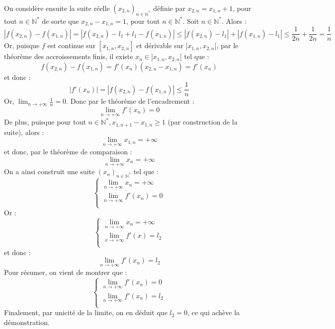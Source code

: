 \documentclass[9pt,a4paper]{article}
\begin{document}
On considère ensuite la suite réelle $(x_{2, n})_{n \in \mathbb{N}^*}$ définie par $x_{2, n} = x_{1, n} + 1$, pour tout $n \in \mathbb{N}^*$ de sorte que $x_{2, n} - x_{1, n} = 1$, pour tout $n \in \mathbb{N}^*$. Soit $n \in \mathbb{N}^*$. Alors :
$$
|f(x_{2, n}) - f(x_{1, n})| = |f(x_{2, n}) - l_1 + l_1 - f(x_{1, n})| \leq |f(x_{2, n}) - l_1| + |f(x_{1, n}) - l_1| \leq \frac{1}{2n} + \frac{1}{2n} = \frac{1}{n}
$$
Or, puisque $f$ est continue sur $[x_{1, n}, x_{2, n}]$ et dérivable sur $]x_{1, n}, x_{2, n}[$, par le théorème des accroissements finis, il existe $x_n \in ]x_{1, n}, x_{2, n}[$ tel que :
$$
f(x_{2, n}) - f(x_{1, n}) = f'(x_n)(x_{2, n} - x_{1, n}) = f'(x_n)
$$
et donc :
$$
|f'(x_n)| = |f(x_{2, n}) - f(x_{1, n})| \leq \frac{1}{n}
$$
Or, $\lim_{n\to+\infty} \frac{1}{n} = 0$. Donc par le théorème de l'encadrement :
$$
\lim_{n\to+\infty} f'(x_n) = 0
$$
De plus, puisque pour tout $n \in \mathbb{N}^*, x_{1, n + 1} - x_{1, n} \geq 1$ (par construction de la suite), alors :
$$
\lim_{n\to+\infty} x_{1, n} = +\infty
$$
et donc, par le théorème de comparaison :
$$
\lim_{n\to+\infty} x_n = +\infty
$$
On a ainsi construit une suite $(x_n)_{n \in \mathbb{N}^*}$ tel que :
$$
\left\{
  \begin{array}{lcl}
    \lim_{n\to+\infty} x_n = +\infty \\
    \lim_{n\to+\infty} f'(x_n) = 0 \\
  \end{array}
\right.
$$
Or :
$$
\left\{
  \begin{array}{lcl}
    \lim_{n\to+\infty} x_n = +\infty \\
    \lim_{x\to+\infty} f'(x) = l_2 \\
  \end{array}
\right.
$$
et donc :
$$
\lim_{n\to+\infty} f'(x_n) = l_2
$$
Pour résumer, on vient de montrer que :
$$
\left\{
  \begin{array}{lcl}
    \lim_{n\to+\infty} f'(x_n) = 0 \\
    \lim_{n\to+\infty} f'(x_n) = l_2 \\
  \end{array}
\right.
$$
Finalement, par unicité de la limite, on en déduit que $l_2 = 0$, ce qui achève la démonstration.
\end{document}
